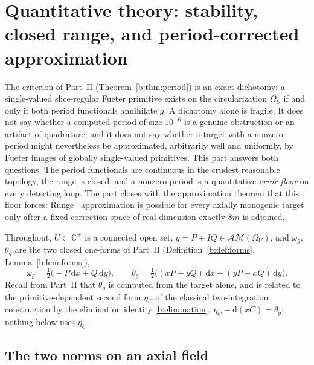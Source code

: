 \documentclass[11pt,a4paper]{article}
\numberwithin{equation}{section}
\theoremstyle{definition}
\theoremstyle{remark}
\theoremstyle{plain}
\newcommand{\CC}{\mathbb C}
\newcommand{\Cplus}{\CC^{+}}
\newcommand{\AM}{\mathcal{AM}}
\newcommand{\Om}{\Omega}
\newcommand{\om}{\omega}
\newcommand{\thet}{\theta}
\newcommand{\etaC}{\eta_{C}}
\newcommand{\pot}{C}          %
\newcommand{\dd}{\mathrm d}
\begin{document}


\section{Quantitative theory: stability, closed range, and period-corrected
approximation}
\label{d:sec:quantitative}

The criterion of Part~II (Theorem~\ref{b:thm:period}) is an exact
dichotomy: a single-valued
slice-regular Fueter primitive exists on the circularization $\Om_U$ if and
only if both period functionals annihilate $g$.  A dichotomy alone is
fragile.  It does not say whether a computed period of size $10^{-6}$ is a
genuine obstruction or an artifact of quadrature, and it does not say
whether a target with a nonzero period might nevertheless be approximated,
arbitrarily well and uniformly, by Fueter images of globally single-valued
primitives.  This part answers both questions.  The period functionals are
continuous in the crudest reasonable topology, the range is closed, and a
nonzero period is a quantitative \emph{error floor} on every detecting
loop.  The part closes with the approximation theorem that this floor
forces: Runge~\cite{Runge} approximation is possible for every axially monogenic target
only after a fixed correction space of real dimension exactly $8m$ is
adjoined.

Throughout, $U\subset\Cplus$ is a connected open set, $g=P+IQ\in\AM(\Om_U)$,
and $\om_g$, $\thet_g$ are the two closed one-forms of Part~II
(Definition~\ref{b:def:forms}, Lemma~\ref{b:lem:forms}),
\begin{equation}
 \om_g=\tfrac12\bigl(-P\,\dd x+Q\,\dd y\bigr),
 \qquad
 \thet_g=\tfrac12\bigl((xP+yQ)\,\dd x+(yP-xQ)\,\dd y\bigr).
 \label{d:eq:forms}
\end{equation}
Recall from Part~II that $\thet_g$ is computed from the target alone, and
is related to the primitive-dependent second form $\etaC$ of the classical
two-integration construction by the elimination identity
\eqref{b:elimination}, $\etaC-\dd(x\pot)=\thet_g$; nothing below uses
$\etaC$.

\subsection{The two norms on an axial field}
\label{d:sec:norms}
\end{document}
